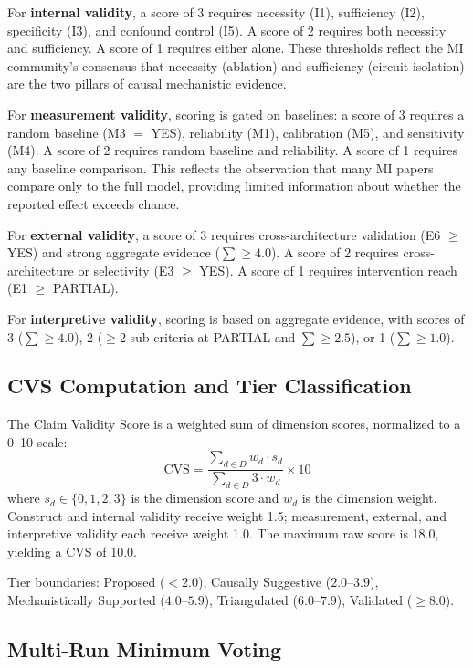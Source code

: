 \documentclass[10pt]{article}
\begin{document}
For \textbf{internal validity}, a score of 3 requires necessity (I1), sufficiency (I2), specificity (I3), and confound control (I5). A score of 2 requires both necessity and sufficiency. A score of 1 requires either alone. These thresholds reflect the MI community's consensus that necessity (ablation) and sufficiency (circuit isolation) are the two pillars of causal mechanistic evidence.

For \textbf{measurement validity}, scoring is gated on baselines: a score of 3 requires a random baseline (M3 $=$ YES), reliability (M1), calibration (M5), and sensitivity (M4). A score of 2 requires random baseline and reliability. A score of 1 requires any baseline comparison. This reflects the observation that many MI papers compare only to the full model, providing limited information about whether the reported effect exceeds chance.

For \textbf{external validity}, a score of 3 requires cross-architecture validation (E6 $\geq$ YES) and strong aggregate evidence ($\sum \geq 4.0$). A score of 2 requires cross-architecture or selectivity (E3 $\geq$ YES). A score of 1 requires intervention reach (E1 $\geq$ PARTIAL).

For \textbf{interpretive validity}, scoring is based on aggregate evidence, with scores of 3 ($\sum \geq 4.0$), 2 ($\geq 2$ sub-criteria at PARTIAL and $\sum \geq 2.5$), or 1 ($\sum \geq 1.0$).

\subsection{CVS Computation and Tier Classification}

The Claim Validity Score is a weighted sum of dimension scores, normalized to a 0--10 scale:
%
\begin{equation}
\text{CVS} = \frac{\sum_{d \in D} w_d \cdot s_d}{\sum_{d \in D} 3 \cdot w_d} \times 10
\end{equation}
%
where $s_d \in \{0,1,2,3\}$ is the dimension score and $w_d$ is the dimension weight. Construct and internal validity receive weight 1.5; measurement, external, and interpretive validity each receive weight 1.0. The maximum raw score is 18.0, yielding a CVS of 10.0.

Tier boundaries: Proposed ($<2.0$), Causally Suggestive ($2.0$--$3.9$), Mechanistically Supported ($4.0$--$5.9$), Triangulated ($6.0$--$7.9$), Validated ($\geq 8.0$).

\subsection{Multi-Run Minimum Voting}
\end{document}
